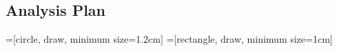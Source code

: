 \documentclass{article}
\begin{document}
\subsection{Analysis Plan} \label{analysis}
\begin{comment}
    • Your proposed analysis pipeline must include all pre-processing steps, and a precise description of all planned analyses (including appropriate correction for multiple comparisons if applicable). Any covariates or regressors must be stated. Where analysis decisions are contingent on the outcome of prior analyses, these contingencies must be specified and adhered to. 
    • Do not include exploratory analyses in the Stage 1 protocol. These should be reported in the Stage 2 manuscript, under the heading Exploratory Analyses.
    
    Should you need to deviate in any way from the description of your work in the Methods after acceptance in principle, you must seek editorial feedback first (before implementing these changes). 
\end{comment}
=[circle, draw, minimum size=1.2cm]
=[rectangle, draw, minimum size=1cm]
\end{document}
